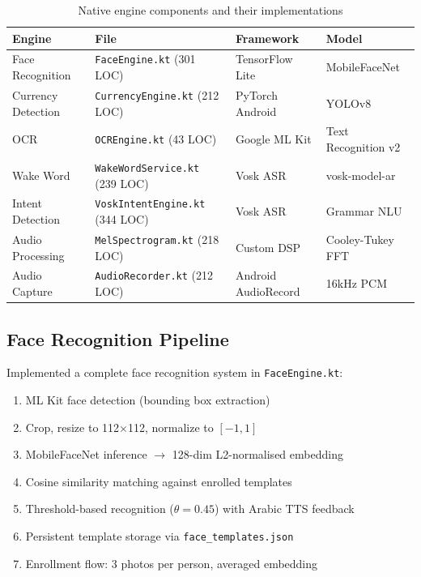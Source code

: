 \documentclass[12pt,a4paper]{article}
\begin{document}
\begin{table}[h]
\centering
\begin{tabular}{llll}
\toprule
\textbf{Engine} & \textbf{File} & \textbf{Framework} & \textbf{Model} \\
\midrule
Face Recognition & \texttt{FaceEngine.kt} (301 LOC) & TensorFlow Lite & MobileFaceNet \\
Currency Detection & \texttt{CurrencyEngine.kt} (212 LOC) & PyTorch Android & YOLOv8 \\
OCR & \texttt{OCREngine.kt} (43 LOC) & Google ML Kit & Text Recognition v2 \\
Wake Word & \texttt{WakeWordService.kt} (239 LOC) & Vosk ASR & vosk-model-ar \\
Intent Detection & \texttt{VoskIntentEngine.kt} (344 LOC) & Vosk ASR & Grammar NLU \\
Audio Processing & \texttt{MelSpectrogram.kt} (218 LOC) & Custom DSP & Cooley-Tukey FFT \\
Audio Capture & \texttt{AudioRecorder.kt} (212 LOC) & Android AudioRecord & 16kHz PCM \\
\bottomrule
\end{tabular}
\caption{Native engine components and their implementations}
\end{table}

\subsection{Face Recognition Pipeline}
Implemented a complete face recognition system in \texttt{FaceEngine.kt}:
\begin{enumerate}
  \item ML Kit face detection (bounding box extraction)
  \item Crop, resize to 112$\times$112, normalize to $[-1, 1]$
  \item MobileFaceNet inference $\rightarrow$ 128-dim L2-normalised embedding
  \item Cosine similarity matching against enrolled templates
  \item Threshold-based recognition ($\theta = 0.45$) with Arabic TTS feedback
  \item Persistent template storage via \texttt{face\_templates.json}
  \item Enrollment flow: 3 photos per person, averaged embedding
\end{enumerate}
\end{document}
